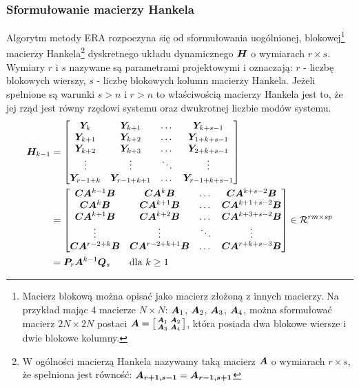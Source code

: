 \subsubsection{Sformułowanie macierzy Hankela} \label{section: hankelMatrix}
Algorytm metody ERA rozpoczyna się od sformułowania uogólnionej, blokowej\footnote{Macierz blokową można opisać jako macierz złożoną z innych macierzy. Na przykład mając 4 macierze $N \times N$: $\bm{A}_1$, $\bm{A}_2$, $\bm{A}_3$, $\bm{A}_4$, można sformułować macierz $2N\times2N$ postaci $\bm{A}=\big[\begin{smallmatrix}
		\bm{A}_1 & \bm{A}_2\\
		\bm{A}_3 & \bm{A}_4
	\end{smallmatrix}\big]$, która posiada dwa blokowe wiersze i dwie blokowe kolumny.
}  
macierzy Hankela\footnote{W ogólności macierzą Hankela nazywamy taką macierz $\bm{A}$ o wymiarach $r\times s$, że spełniona jest równość: $\bm{A_{r+1,s-1}}=\bm{A_{r-1,s+1}}$ 
} 
dyskretnego układu dynamicznego $\bm{H}$ o wymiarach $r\times s$. Wymiary $r$ i $s$ nazywane są parametrami projektowymi \parencite{Szafranski2013} i oznaczają: $r$ - liczbę blokowych wierszy, $s$ - liczbę blokowych kolumn macierzy Hankela. Jeżeli spełnione są warunki $s>n$ i $r>n$ to właściwością macierzy Hankela jest to, że jej rząd jest równy rzędowi systemu oraz dwukrotnej liczbie modów systemu.
\begin{equation} \label{eq: genericHankelMatrix}
	\begin{split}
	\bm{H}_{k-1}&=\begin{bmatrix}
		\bm{Y}_k		&	\bm{Y}_{k+1} 	& \dots	& \bm{Y}_{k+s-1} \\
		\bm{Y}_{k+1}	&	\bm{Y}_{k+2}	& \dots	& \bm{Y}_{1+k+s-1} \\
		\bm{Y}_{k+2}	&	\bm{Y}_{k+3} 	& \dots	& \bm{Y}_{2+k+s-1} \\	
		\vdots			&	\vdots			& \ddots & \vdots\\
		\bm{Y}_{r-1+k}	&	\bm{Y}_{r-1+k+1} 	& \dots	& \bm{Y}_{r-1+k+s-1} 	
	\end{bmatrix} \\ 
&= \begin{bmatrix}
	\bm{C}\bm{A}^{k-1}\bm{B}	&	\bm{C}\bm{A}^{k}\bm{B} 	& \dots	 & \bm{C}\bm{A}^{k+s-2}\bm{B} \\
	\bm{C}\bm{A}^{k}\bm{B}	&	\bm{C}\bm{A}^{k+1}\bm{B} 	& \dots	 & \bm{C}\bm{A}^{k+1+s-2}\bm{B} \\
	\bm{C}\bm{A}^{k+1}\bm{B}	&	\bm{C}\bm{A}^{k+2}\bm{B} 	& \dots	 & \bm{C}\bm{A}^{k+3+s-2}\bm{B} \\	
	\vdots							&	\vdots							& \ddots & \vdots\\
	\bm{C}\bm{A}^{r-2+k}\bm{B}	&	\bm{C}\bm{A}^{r-2+k+1}\bm{B} 	& \dots	 & \bm{C}\bm{A}^{r+k+s-3}\bm{B} 	
\end{bmatrix}\in \mathcal{R}^{rm\times sp}\\
&= \bm{P}_r \bm{A}^{k-1}\bm{Q}_s\qquad \text{dla } k\ge 1
\end{split}
\end{equation}
